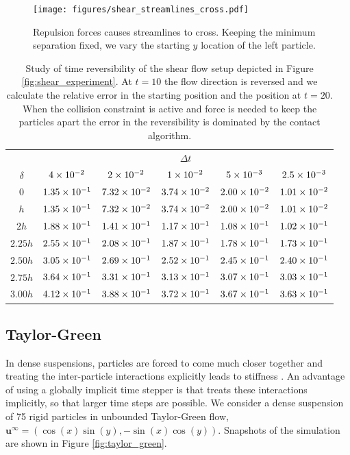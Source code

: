 \documentclass[preprint, 10pt]{elsarticle}
\begin{document}
\begin{figure}[!h]
\begin{center}
\texttt{[image: figures/shear\_streamlines\_cross.pdf]}
\end{center}
\caption{Repulsion forces causes streamlines to cross. Keeping the minimum separation fixed, we vary
the starting $y$ location of the left particle.}\label{fig:shear_cross}
\end{figure}

\begin{table}[!h]
\begin{center}
\begin{tabular}{c| c c c c c}
$ $ & & & $\Delta t$ & &\\
$\delta$ & $4\times 10^{-2}$ &$ 2\times 10^{-2}$ & $1\times 10^{-2}$ & $5\times 10^{-3}$ & $2.5\times 10^{-3}$\\
\hline
0 & $1.35\times 10^{-1}$ & $7.32\times 10^{-2}$ & $3.74\times 10^{-2}$ & $2.00\times 10^{-2}$ & $1.01\times 10^{-2}$\\
$h$ & $1.35\times 10^{-1}$ & $7.32\times 10^{-2}$ & $3.74\times 10^{-2}$ & $2.00\times 10^{-2}$ & $1.01\times 10^{-2}$\\
$2h$ & $1.88\times 10^{-1}$ & $1.41\times 10^{-1}$ & $1.17\times 10^{-1}$ & $1.08\times 10^{-1}$ &
$1.02\times 10^{-1}$\\
$2.25h$ & $2.55\times 10^{-1}$ & $2.08\times 10^{-1}$ & $1.87\times 10^{-1}$ & $1.78\times 10^{-1}$ &
$1.73\times 10^{-1}$\\
$2.50h$ & $3.05\times 10^{-1}$ & $2.69\times 10^{-1}$ & $2.52\times 10^{-1}$ & $2.45\times 10^{-1}$ &
$2.40\times 10^{-1}$\\
$2.75h$ & $3.64\times 10^{-1}$ & $3.31\times 10^{-1}$ & $3.13\times 10^{-1}$ & $3.07\times 10^{-1}$ &
$3.03\times 10^{-1}$\\
$3.00h$ & $4.12\times 10^{-1}$ & $3.88\times 10^{-1}$ & $3.72\times 10^{-1}$ & $3.67\times 10^{-1}$ &
$3.63\times 10^{-1}$
\end{tabular}
\end{center}
\caption{Study of time reversibility of the shear flow setup depicted in Figure
\ref{fig:shear_experiment}. At $t=10$ the flow direction is reversed and we
calculate the relative error in the starting position and the position at
$t=20$. When the collision constraint is active and force is needed to keep the
particles apart the error in the reversibility is dominated by the contact
algorithm.}\label{tab:reverse}
\end{table}

\FloatBarrier
\subsection{Taylor-Green}

In dense suspensions, particles are forced to come much closer together and treating the
inter-particle interactions explicitly leads to stiffness \cite{Quaife2014}. An advantage of using a
globally implicit time stepper is that treats these interactions implicitly, so that larger time
steps are possible. We
consider a dense suspension of 75 rigid particles in unbounded Taylor-Green
flow, $\mathbf{u}^\infty =
(\cos(x)\sin(y), -\sin(x)\cos(y))$. Snapshots of the simulation are shown in
Figure \ref{fig:taylor_green}.
\end{document}
